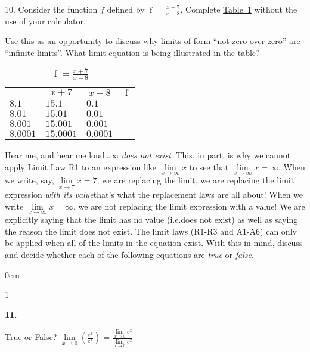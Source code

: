 \documentclass[12pt,]{book}
\theoremstyle{plain}
\theoremstyle{definition}
\numberwithin{equation}{section}
\newcommand{\hrulemedium}{\noalign{\hrule height 0.07em}}
\newcommand{\hrulethick} {\noalign{\hrule height 0.11em}}
\newenvironment{exercisegroup}%
{\medskip\noindent}%
{\par\bigskip}%
\newlength{\exercisegroupindent}%
\newlength{\exercisegroupitemwidth}%
\newenvironment{exercisegrouplist}%
{\vspace{-\partopsep}%
\begin{adjustwidth}{\exercisegroupindent}{0em}}%
{\end{adjustwidth}%
\vspace{-\partopsep}%
\vspace{\baselineskip}}%
\newenvironment{exercisegroupbycol}[1]%
{\begin{exercisegrouplist}%
\vspace{-\multicolsep}%
\begin{multicols}{#1}%
\setlength{\parindent}{0em}%
\setlength{\exercisegroupitemwidth}{\linewidth}}%
{\end{multicols}%
\vspace{-\multicolsep}%
\end{exercisegrouplist}}%
\newenvironment{exercisegroupitem}[1]%
{\begin{minipage}[t]{\exercisegroupitemwidth}
\vspace{0pt}%
{\bfseries#1}%
\rule{0pt}{\baselineskip}}{\strut%
\end{minipage}%
\hspace{\columnsep}}%
\providecommand\phantomsection{}
\newcommand{\fe}[2]{\mathop{{#1}{\left(#2\right)}}}
\begin{document}
\begin{exerciselist}
\item[10.]\phantomsection\hypertarget{exercise-83}{\null}Consider the function \(f\) defined by \(\fe{f}{x}=\frac{x+7}{x-8}\). Complete \hyperref[table-vertical-asymptote]{Table~\ref*{table-vertical-asymptote}} without the use of your calculator.%
\par
Use this as an opportunity to discuss why limits of form ``not-zero over zero'' are ``infinite limits''. What limit equation is being illustrated in the table?%
\begin{table}
\centering
\caption{\(\fe{f}{x}=\frac{x+7}{x-8}\)\label{table-vertical-asymptote}}
\begin{tabular}{llll}\hrulethick
\multicolumn{1}{c}{\(x\)}&\multicolumn{1}{c}{\(x+7\)}&\multicolumn{1}{c}{\(x-8\)}&\multicolumn{1}{c}{\(\fe{f}{x}\)}\\\hrulemedium
\(8.1\)&\(15.1\)&\(0.1\)&\\
\(8.01\)&\(15.01\)&\(0.01\)&\\
\(8.001\)&\(15.001\)&\(0.001\)&\\
\(8.0001\)&\(15.0001\)&\(0.0001\)&
\end{tabular}
\end{table}
\par\smallskip
\begin{exercisegroup}%
Hear me, and hear me loud\dots{}\(\infty\) \emph{does not exist}. This, in part, is why we cannot apply Limit Law R1 to an expression like \(\lim\limits_{x\to\infty}x\) to see that \(\lim\limits_{x\to\infty}x=\infty\). When we write, say, \(\lim\limits_{x\to7}x=7\), we are replacing the limit, we are replacing the limit expression \emph{with its value}\textemdash{}that’s what the replacement laws are all about! When we write \(\lim\limits_{x\to\infty}x=\infty\), we are not replacing the limit expression with a value! We are explicitly saying that the limit has no value (i.e.\@ does not exist) as well as saying the reason the limit does not exist. The limit laws (R1-R3 and A1-A6) can only be applied when all of the limits in the equation exist. With this in mind, discuss and decide whether each of the following equations are \emph{true} or \emph{false}.%
\begin{exercisegroupbycol}{1}%
\begin{exercisegroupitem}{11. }\phantomsection\hypertarget{exercise-hear-me-first}{\null}
True or False? \(\lim\limits_{x\to0}\left(\frac{e^x}{e^x}\right)=\frac{\lim\limits_{x\to0}e^x}{\lim\limits_{x\to0}e^x}\)%
\end{exercisegroupitem}%

\end{exercisegroupbycol}
\end{exercisegroup}
\end{exerciselist}
\end{document}
